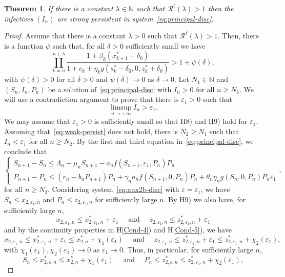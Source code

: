 \documentclass[reqno]{amsart}
\newtheorem{theorem}{Theorem}
\renewcommand{\le}{\leqslant}
\renewcommand{\ge}{\geqslant}
\newcommand{\eps}{\varepsilon}
\newcommand{\cR}{\mathcal R}
\newcommand{\N}{\ensuremath{\mathds N}}
\begin{document}
{{\begin{theorem}\label{teo:Main-ext}
If there is a constant $\lambda \in \N$ such that $\cR^\ell(\lambda)>1$ then the infectives $(I_n)$ are strong persistent in system~\eqref{eq:principal-disc}.
\end{theorem}

\begin{proof}
Assume that there is a constant $\lambda>0$ such that $\cR^\ell(\lambda)>1$. Then, there is a function $\psi$ such that, for all $\delta>0$ sufficiently small we have
\begin{equation}\label{eq:condi-per}
\prod_{k=n}^{n+\lambda} \dfrac{1+\beta_k(x^*_{k+1}-\delta_0)}{1+c_k+\eta_kg(s^*_k-\delta_0,0,z^*_k+\delta_0)}>1+\psi(\delta),
\end{equation}
with $\psi(\delta)>0$ for all $\delta>0$ and $\psi(\delta)\to 0$ as $\delta \to 0$.
Let $N_1 \in \N$ and $(S_n,I_n,P_n)$ be a solution of~\eqref{eq:principal-disc} with $I_n>0$ for all $n \ge N_1$. We will use a contradiction argument to prove that there is $\eps_1>0$ such that
    \begin{equation}\label{eq:weak-persist}
    \limsup_{n \to +\infty} I_n >\eps_1.
    \end{equation}
We may assume that $\eps_1>0$ is sufficiently small so that {H8)} and {H9)} hold for $\eps_1$.
Assuming that~\eqref{eq:weak-persist} does not hold, there is $N_2 \ge N_1$ such that $I_n<\eps_1$ for all $n \ge N_2$.
By the first and third equation in~\eqref{eq:principal-disc}, we conclude that
\[
\begin{cases}
S_{n+1}-S_n\le\Lambda_n-\mu_nS_{n+1}-a_n{f(S_{n+1},\eps_1,P_n)P_n}\\
P_{n+1}-P_n\le(r_n-b_nP_{n+1})P_n+\gamma_na_n{f(S_{n+1},0,P_n)P_n}+\theta_n\eta_ng(S_n,0,P_n)P_n\eps_1
\end{cases},
\]
for all $n \ge N_2$. Considering system~\eqref{eq:aux2b-disc} with $\eps=\eps_1$, we have $S_n \le x_{2,\eps_1,n}$ and $P_n \le z_{2,\eps_1,n}$ for sufficiently large $n$. By {H9)}  we also have, for sufficiently large $n$,
\[
x_{2,\eps_1,n} \le x_{2,\eps_1,n}^*+\eps_1 \quad \text{ and } \quad z_{2,\eps_1,n} \le z_{2,\eps_1,n}^*+\eps_1
\]
and by the continuity properties in H\ref{Cond-4}) and H\ref{Cond-5}), we have
\[
x_{2,\eps_1,n} \le x_{2,\eps_1,n}^*+\eps_1 \le x_{2,n}^*+\chi_1(\eps_1) \quad \text{ and } \quad z_{2,\eps_1,n} \le z_{2,\eps_1,n}^*+\eps_1 \le
z_{2,\eps_1,n}^*+ \chi_2(\eps_1),
\]
with $\chi_1(\eps_1),\chi_2(\eps_1) \to 0$ as $\eps_1\to 0$. Thus, in particular, for sufficiently large $n$,
\begin{equation}\label{eq:Pn-persist}
    S_n \le x^*_{2,\eps,n} \le x_{2,n}^*+\chi_1(\eps_1) \quad \text{ and } \quad P_n \le z^*_{2,\eps,n} \le z_{2,\eps_1,n}^*+ \chi_2(\eps_1),
\end{equation}


\end{proof}}}
\end{document}
